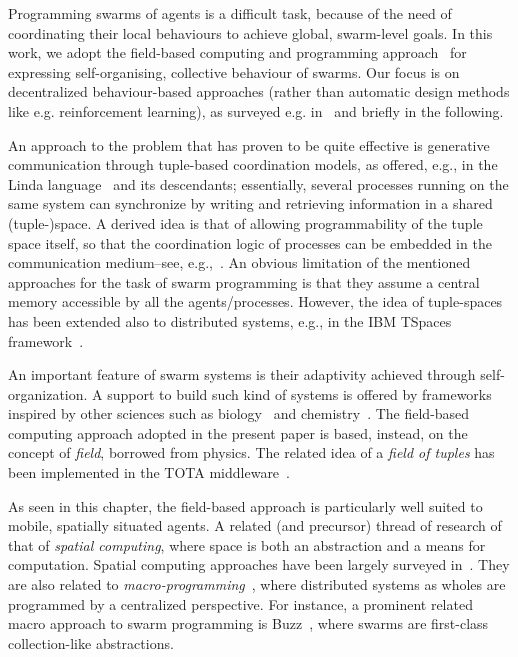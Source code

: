 Programming swarms of agents is a difficult task, 
 because of the need of coordinating their local behaviours to achieve global, swarm-level goals.
%
In this work, we adopt the field-based computing and programming approach~\cite{DBLP:journals/jlap/ViroliBDACP19}
 for expressing self-organising, collective behaviour of swarms.
%
Our focus is on decentralized behaviour-based approaches (rather than automatic design methods like e.g. reinforcement learning),
 as surveyed e.g. in~\cite{DBLP:journals/swarm/BrambillaFBD13,DBLP:journals/jlap/ViroliBDACP19}
 and briefly in the following.

%
An approach to the problem that has proven to be quite effective is generative communication through tuple-based coordination models, 
 as offered, e.g., in the Linda language~\cite{linda} and its descendants; 
 essentially, several processes running on the same system can synchronize by writing and retrieving information in a shared (tuple-)space.
A derived idea is that of allowing programmability of the tuple space itself, so that the coordination logic of processes can be embedded in the communication medium--see, e.g.,~\cite{respect-scico2001}.
An obvious limitation of the mentioned approaches for the task of swarm programming is that they assume a central memory accessible by all the agents/processes. 
 However, the idea of tuple-spaces has been extended also to distributed systems, e.g., in the IBM TSpaces framework~\cite{Wyckoff:1998}.

An important feature of swarm systems is their adaptivity achieved through self-organization.
%
A support to build such kind of systems is offered by frameworks inspired by other sciences such as biology~\cite{tolksdorf2003using} and chemistry~\cite{DBLP:journals/alife/Sayama09}.
%
The field-based computing approach adopted in the present paper is based, instead, on the concept of {\em field}, borrowed from physics.
%
The related idea of a {\em field of tuples} has been implemented in the TOTA middleware~\cite{tota}.

As seen in this chapter, the field-based approach is particularly well suited to mobile, spatially situated agents.
%
A related (and precursor) thread of research of that of {\em spatial computing},
 where space is both an abstraction and a means for computation.
%
Spatial computing approaches have been largely surveyed in~\cite{SpatialIGI2013}.
%
They are also related to \emph{macro-programming}~\cite{DBLP:conf/ipsn/NewtonMW07},
 where distributed systems as wholes are programmed by a centralized perspective.
%
For instance, a prominent related macro approach to swarm programming
 is Buzz~\cite{DBLP:journals/software/PinciroliB16},
 where swarms are first-class collection-like abstractions.

